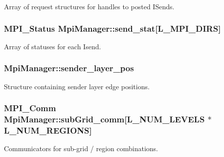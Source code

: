 Array of request structures for handles to posted I\+Sends. 

\subsubsection[{\texorpdfstring{send\+\_\+stat}{send_stat}}]{\setlength{\rightskip}{0pt plus 5cm}M\+P\+I\+\_\+\+Status Mpi\+Manager\+::send\+\_\+stat\mbox{[}{\bf L\+\_\+\+M\+P\+I\+\_\+\+D\+I\+RS}\mbox{]}}\hypertarget{class_mpi_manager_a3ccb49ceda719f0c6bb90593a880a730}{}\label{class_mpi_manager_a3ccb49ceda719f0c6bb90593a880a730}


Array of statuses for each Isend. 

\subsubsection[{\texorpdfstring{sender\+\_\+layer\+\_\+pos}{sender_layer_pos}}]{ Mpi\+Manager\+::sender\+\_\+layer\+\_\+pos}\hypertarget{class_mpi_manager_a0cb9f8f024ec0a186374995fb203ea1e}{}\label{class_mpi_manager_a0cb9f8f024ec0a186374995fb203ea1e}


Structure containing sender layer edge positions. 

\subsubsection[{\texorpdfstring{sub\+Grid\+\_\+comm}{subGrid_comm}}]{\setlength{\rightskip}{0pt plus 5cm}M\+P\+I\+\_\+\+Comm Mpi\+Manager\+::sub\+Grid\+\_\+comm\mbox{[}{\bf L\+\_\+\+N\+U\+M\+\_\+\+L\+E\+V\+E\+LS} $\ast${\bf L\+\_\+\+N\+U\+M\+\_\+\+R\+E\+G\+I\+O\+NS}\mbox{]}}\hypertarget{class_mpi_manager_a0926101699de914f6be018885bea25b1}{}\label{class_mpi_manager_a0926101699de914f6be018885bea25b1}


Communicators for sub-\/grid / region combinations. 

